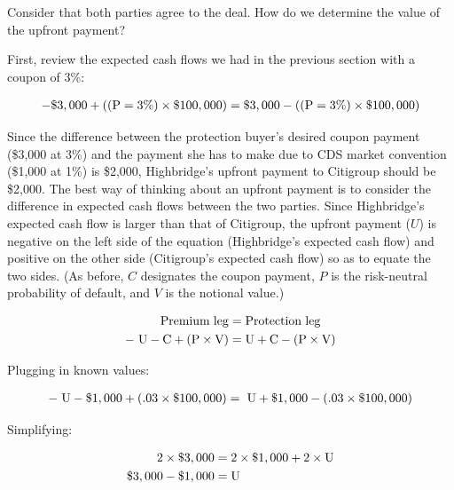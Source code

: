 \documentclass{jss}
\begin{document}
Consider that both parties agree to the deal. How do we determine the value of the upfront payment?

First, review the expected cash flows we had in the previous section with a coupon of 3\%:

\begin{equation}
 \begin{aligned}
   {\rm - \$3,000 + ((P = 3\%) \times \$100,000) = \$3,000 - ((P = 3\%) \times \$100,000)}
    \end{aligned}
\end{equation}

Since the difference between the protection buyer's desired coupon payment (\$3,000 at 3\%) and the payment she has to make due to CDS market convention (\$1,000 at 1\%) is \$2,000, Highbridge's upfront payment to Citigroup should be \$2,000. The best way of thinking about an upfront payment is to consider the difference in expected cash flows between the two parties. Since Highbridge's expected cash flow is larger than that of Citigroup, the upfront payment ($U$) is negative on the left side of the equation (Highbridge's expected cash flow) and positive on the other side (Citigroup's expected cash flow) so as to equate the two sides. (As before, $C$ designates the coupon payment, $P$ is the risk-neutral probability of default, and $V$ is the notional value.)

\label{eqn:Upfront}
\begin{align}
   \rm Premium\hspace{3pt}leg &= \rm Protection\hspace{3pt}leg \\
   \rm -\hspace{3pt}U - C + (P \times V) &= \rm U + C - (P \times V)
\end{align}

Plugging in known values:

\begin{equation}
 \begin{aligned}
   {\rm -\hspace{3pt}U - \$1,000 + (.03 \times \$100,000) = \hspace{3pt}U + \$1,000 - (.03 \times \$100,000)}
    \end{aligned}
\end{equation}

Simplifying:


\begin{align}
   \rm 2 \times \$3,000 &= \rm 2 \times \$1,000 + 2 \times U \\
   \rm \$3,000 - \$1,000 &= \rm U
\end{align}
\end{document}
